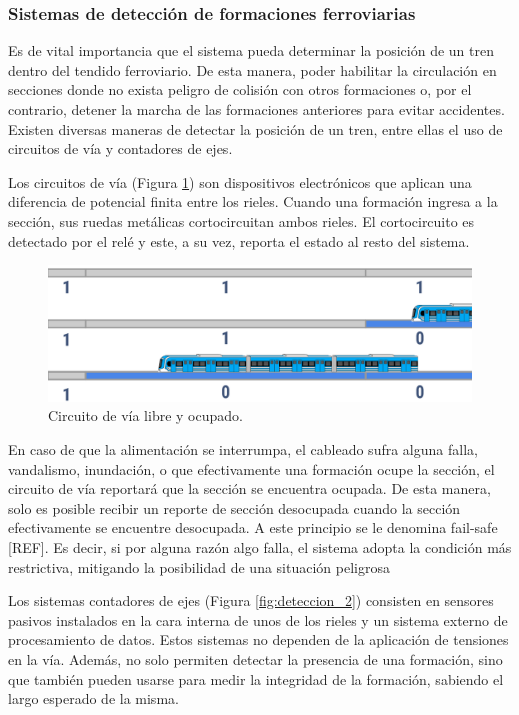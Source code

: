 \subsubsection{Sistemas de detección de formaciones ferroviarias}

Es de vital importancia que el sistema pueda determinar la posición de un tren dentro del tendido ferroviario. De esta manera, poder habilitar la circulación en secciones donde no exista peligro de colisión con otros formaciones o, por el contrario, detener la marcha de las formaciones anteriores para evitar accidentes. Existen diversas maneras de detectar la posición de un tren, entre ellas el uso de circuitos de vía y contadores de ejes. 

Los circuitos de vía (Figura \ref{fig:deteccion_1}) son dispositivos electrónicos que aplican una diferencia de potencial finita entre los rieles. Cuando una formación ingresa a la sección, sus ruedas metálicas cortocircuitan ambos rieles. El cortocircuito es detectado por el relé y este, a su vez, reporta el estado al resto del sistema. 

    \begin{figure}[!h]
        \centering
        \includegraphics[width=1\textwidth]{Figuras/circuito_via}
        \centering\caption{Circuito de vía libre y ocupado.}
        \label{fig:deteccion_1}
    \end{figure}

En caso de que la alimentación se interrumpa, el cableado sufra alguna falla, vandalismo, inundación, o que efectivamente una formación ocupe la sección, el circuito de vía reportará que la sección se encuentra ocupada. De esta manera, solo es posible recibir un reporte de sección desocupada cuando la sección efectivamente se encuentre desocupada. A este principio se le denomina fail-safe [REF]. Es decir, si por alguna razón algo falla, el sistema adopta la condición más restrictiva, mitigando la posibilidad de una situación peligrosa

Los sistemas contadores de ejes (Figura \ref{fig:deteccion_2}) consisten en sensores pasivos instalados en la cara interna de unos de los rieles y un sistema externo de procesamiento de datos. Estos sistemas no dependen de la aplicación de tensiones en la vía. Además, no solo permiten detectar la presencia de una formación, sino que también pueden usarse para medir la integridad de la formación, sabiendo el largo esperado de la misma. 

